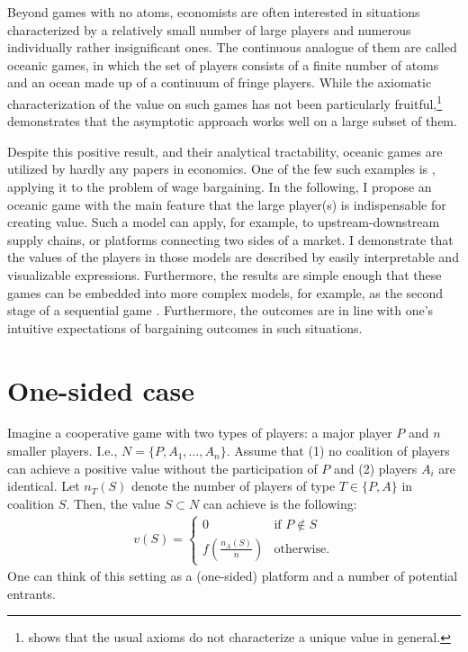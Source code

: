 \documentclass[a4paper]{article}
\begin{document}
Beyond games with no atoms, economists are often interested in situations characterized by a relatively small number of large players and numerous individually rather insignificant ones. The continuous analogue of them are called oceanic games, in which the set of players consists of a finite number of atoms and an ocean made up of a continuum of fringe players. While the axiomatic characterization of the value on such games has not been particularly fruitful,\footnote{\textcite{hart1973values} shows that the usual axioms do not characterize a unique value in general.} \textcite{fogelman1980asymptotic} demonstrates that the asymptotic approach works well on a large subset of them.

Despite this positive result, and their analytical tractability, oceanic games are utilized by hardly any papers in economics. One of the few such examples is \textcite{levy1997individual}, applying it to the problem of wage bargaining. In the following, I propose an oceanic game with the main feature that the large player(s) is indispensable for creating value. Such a model can apply, for example, to upstream-downstream supply chains, or platforms connecting two sides of a market. I demonstrate that the values of the players in those models are described by easily interpretable and visualizable expressions. Furthermore, the results are simple enough that these games can be embedded into more complex models, for example, as the second stage of a sequential game \parencite[as in e.g.][]{montez2007downstream}. Furthermore, the outcomes are in line with one's intuitive expectations of bargaining outcomes in such situations.


\section{One-sided case}

Imagine a cooperative game with two types of players: a major player $P$ and $n$ smaller players. I.e., $N = \{P, A_1, \dots, A_n\}$. Assume that (1) no coalition of players can achieve a positive value without the participation of $P$ and (2) players $A_i$ are identical. Let $n_T(S)$ denote the number of players of type $T \in \{P, A\}$ in coalition $S$. Then, the value $S \subset N$ can achieve is the following:
\begin{align*}
    v(S) = \begin{cases}
        0                              & \text{if } P \notin S \\
        f\left(\frac{n_A(S)}{n}\right) & \text{otherwise}.
    \end{cases}
\end{align*}
One can think of this setting as a (one-sided) platform and a number of potential entrants.
\end{document}
